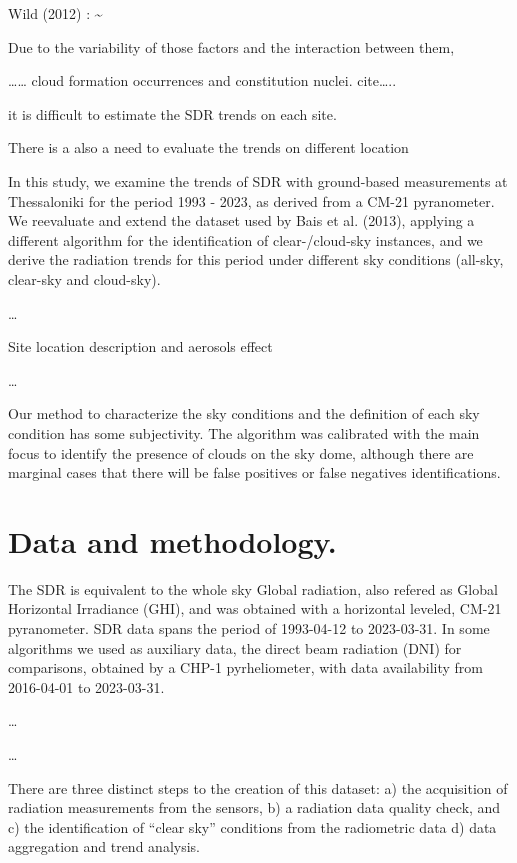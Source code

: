 \documentclass[
  preprint, 3p, authoryear]{article}
\begin{document}
Wild (2012) : \textasciitilde{}

Due to the variability of those factors and the interaction between them,

\ldots\ldots{} cloud formation occurrences and constitution nuclei. cite\ldots..

it is difficult to estimate the SDR trends on each site.

There is a also a need to evaluate the trends on different location

In this study, we examine the trends of SDR with ground-based measurements at Thessaloniki for the period 1993 - 2023, as derived from a CM-21 pyranometer.
We reevaluate and extend the dataset used by Bais et al. (2013), applying a different algorithm for the identification of clear-/cloud-sky instances, and we derive the radiation trends for this period under different sky conditions (all-sky, clear-sky and cloud-sky).

\ldots{}

Site location description and aerosols effect

\ldots{}

Our method to characterize the sky conditions and the definition of each sky condition has some subjectivity.
The algorithm was calibrated with the main focus to identify the presence of clouds on the sky dome, although there are marginal cases that there will be false positives or false negatives identifications.

\hypertarget{data-and-methodology.}{%
\section{Data and methodology.}\label{data-and-methodology.}}

The SDR is equivalent to the whole sky Global radiation, also refered as Global Horizontal Irradiance (GHI), and was obtained with a horizontal leveled, CM-21 pyranometer.
SDR data spans the period of
1993-04-12 to 2023-03-31.
In some algorithms we used as auxiliary data, the direct beam radiation (DNI) for comparisons, obtained by a CHP-1 pyrheliometer, with data availability from
2016-04-01 to 2023-03-31.

\ldots{}

\ldots{}

There are three distinct steps to the creation of this dataset:
a) the acquisition of radiation measurements from the sensors,
b) a radiation data quality check, and
c) the identification of ``clear sky'' conditions from the radiometric data
d) data aggregation and trend analysis.
\end{document}
